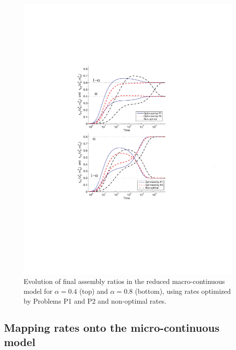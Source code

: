     \begin{figure}[!t]
        \centering
        \includegraphics[trim= 40mm 75mm 10mm 60mm, clip,scale=0.65,angle=0]{img/ODE_alpha_comp2.pdf}
        \caption{Evolution of final assembly ratios in the reduced macro-continuous model
         for $\alpha=0.4$ (top) and $\alpha = 0.8$ (bottom), using rates optimized by
         Problems P1 and P2 and non-optimal rates.}
        \label{fig:ODEalpha_pt4}
    \end{figure}



\subsection{Mapping rates onto the micro-continuous model} %
\label{sub:mapping_on_the_microscopic_model}

